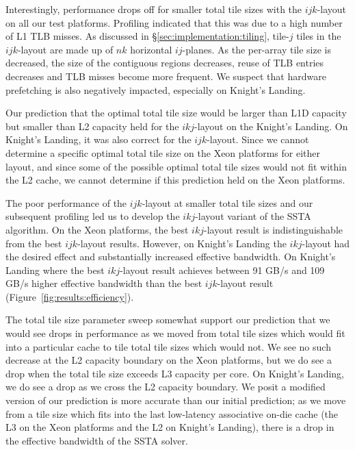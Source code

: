\documentclass{sig-alternate-05-2015}
\begin{document}
Interestingly, performance drops off for smaller total tile sizes with the
  \(ijk\)-layout on all our test platforms.
Profiling indicated that this was due to a high number of L1 TLB misses.
As discussed in \S\ref{sec:implementation:tiling}, tile-\(j\) tiles in the
  \(ijk\)-layout are made up of \(nk\) horizontal \(ij\)-planes. 
As the per-array tile size is decreased, the size of the contiguous regions
  decreases, reuse of TLB entries decreases and TLB misses become more frequent.
We suspect that hardware prefetching is also negatively impacted, especially on
  Knight's Landing.

Our prediction that the optimal total tile size would be larger than L1D
  capacity but smaller than L2 capacity held for the \(ikj\)-layout on the
  Knight's Landing.
On Knight's Landing, it was also correct for the \(ijk\)-layout.
Since we cannot determine a specific optimal total tile size on the Xeon
  platforms for either layout, and since some of the possible optimal total tile
  sizes would not fit within the L2 cache, we cannot determine if this prediction
  held on the Xeon platforms.

The poor performance of the \(ijk\)-layout at smaller total tile sizes and our
  subsequent profiling led us to develop the \(ikj\)-layout variant of the SSTA
  algorithm.
On the Xeon platforms, the best \(ikj\)-layout result is indistinguishable from
  the best \(ijk\)-layout results.
However, on Knight's Landing the \(ikj\)-layout had the desired effect and
  substantially increased effective bandwidth.
On Knight's Landing where the best \(ikj\)-layout result achieves between 91
  GB/s and 109 GB/s higher effective bandwidth than the best \(ijk\)-layout
  result (Figure~\ref{fig:results:efficiency}).

The total tile size parameter sweep somewhat support our prediction that we
  would see drops in performance as we moved from total tile sizes which would
  fit into a particular cache to tile total tile sizes which would not.
We see no such decrease at the L2 capacity boundary on the Xeon platforms, but
  we do see a drop when the total tile size exceeds L3 capacity per core.
On Knight's Landing, we do see a drop as we cross the L2 capacity boundary.
We posit a modified version of our prediction is more accurate than our initial
  prediction; as we move from a tile size which fits into the last low-latency
  associative on-die cache (the L3 on the Xeon platforms and the L2 on Knight's
  Landing), there is a drop in the effective bandwidth of the SSTA solver.
\end{document}
